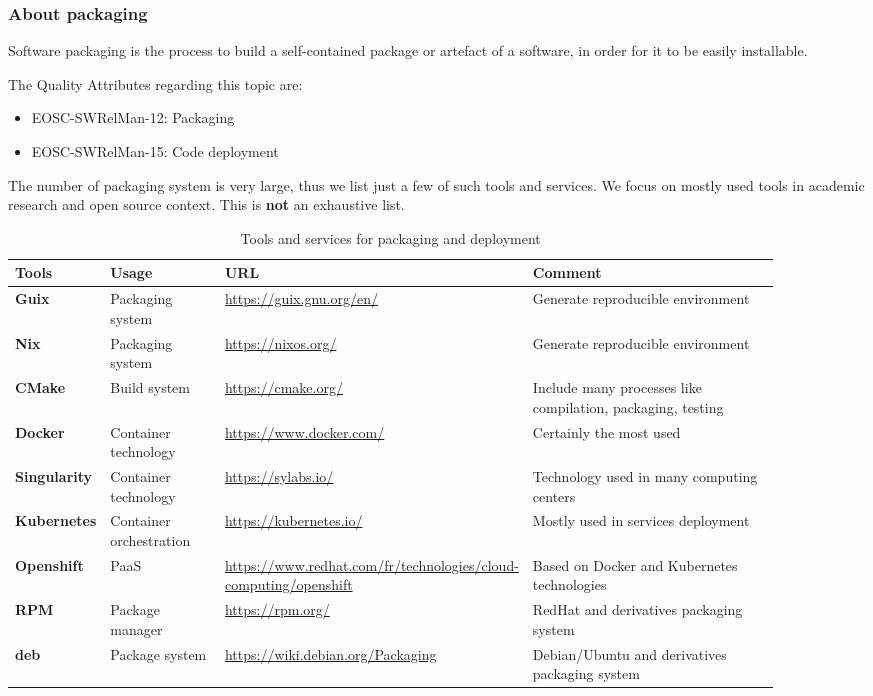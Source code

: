 \subsubsection{About packaging}

Software packaging is the process to build a self-contained package or artefact of a software, in order for it to be easily installable.

The Quality Attributes regarding this topic are:

\begin{itemize}
  \item EOSC-SWRelMan-12: Packaging
  \item EOSC-SWRelMan-15: Code deployment
\end{itemize}

The number of packaging system is very large, thus we list just a few of such tools and services. We focus on mostly used tools in academic research and open
source context. This is {\bf not} an exhaustive list.

\begin{table}[h]
  \centering
  \scriptsize
  \begin{tabular}{|p{0.08\linewidth}|p{0.16\linewidth}|p{0.26\linewidth}|p{0.39\linewidth}|} \hline

    \textbf{Tools} & \textbf{Usage} & \textbf{URL} & \textbf{Comment} \\ \hline \hline
    \textbf{Guix} & Packaging system & \url{https://guix.gnu.org/en/} & Generate reproducible environment \\ \hline
    \textbf{Nix} & Packaging system & \url{https://nixos.org/} & Generate reproducible environment \\ \hline
    \textbf{CMake} & Build system & \url{https://cmake.org/} & Include many processes like compilation, packaging, testing  \\ \hline
    \textbf{Docker} & Container technology & \url{https://www.docker.com/} &  Certainly the most used \\ \hline
    \textbf{Singularity} & Container technology & \url{https://sylabs.io/} & Technology used in many computing centers \\ \hline
    \textbf{Kubernetes} & Container orchestration & \url{https://kubernetes.io/} & Mostly used in services deployment  \\ \hline
    \textbf{Openshift} & PaaS & \url{https://www.redhat.com/fr/technologies/cloud-computing/openshift} & Based on Docker and Kubernetes technologies  \\ \hline
    \textbf{RPM} & Package manager & \url{https://rpm.org/} & RedHat and derivatives packaging system \\ \hline
    \textbf{deb} & Package system & \url{https://wiki.debian.org/Packaging} & Debian/Ubuntu and derivatives packaging system \\ \hline

  \end{tabular}
  \caption{Tools and services for packaging and deployment}
  \label{tab:tools_pack01}
\end{table}

